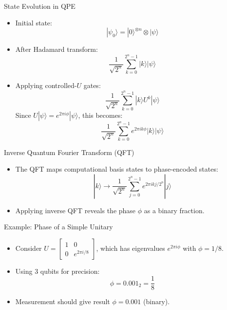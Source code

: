 \documentclass{beamer}
\begin{document}
\begin{frame}{State Evolution in QPE}
    \begin{itemize}
        \item Initial state:
        \[
        | \psi_0 \rangle = | 0 \rangle^{\otimes n} \otimes | \psi \rangle
        \]
        \item After Hadamard transform:
        \[
        \frac{1}{\sqrt{2^n}} \sum_{k=0}^{2^n - 1} | k \rangle | \psi \rangle
        \]
        \item Applying controlled-$U$ gates:
        \[
        \frac{1}{\sqrt{2^n}} \sum_{k=0}^{2^n - 1} | k \rangle U^k | \psi \rangle
        \]
        Since $U | \psi \rangle = e^{2\pi i \phi} | \psi \rangle$, this becomes:
        \[
        \frac{1}{\sqrt{2^n}} \sum_{k=0}^{2^n - 1} e^{2\pi i k \phi} | k \rangle | \psi \rangle
        \]
    \end{itemize}
\end{frame}

\begin{frame}{Inverse Quantum Fourier Transform (QFT)}
    \begin{itemize}
        \item The QFT maps computational basis states to phase-encoded states:
        \[
        | k \rangle \to \frac{1}{\sqrt{2^n}} \sum_{j=0}^{2^n - 1} e^{2\pi i k j / 2^n} | j \rangle
        \]
        \item Applying inverse QFT reveals the phase $\phi$ as a binary fraction.
    \end{itemize}
    \centering
    \begin{tikzpicture}
    \end{tikzpicture}
\end{frame}

\begin{frame}{Example: Phase of a Simple Unitary}
    \begin{itemize}
        \item Consider $U = \begin{bmatrix} 1 & 0 \\ 0 & e^{2\pi i / 8} \end{bmatrix}$, which has eigenvalues $e^{2\pi i \phi}$ with $\phi = 1/8$.
        \item Using 3 qubits for precision:
        \[
        \phi = 0.001_2 = \frac{1}{8}
        \]
        \item Measurement should give result $\phi = 0.001$ (binary).
    \end{itemize}
\end{frame}
\end{document}
